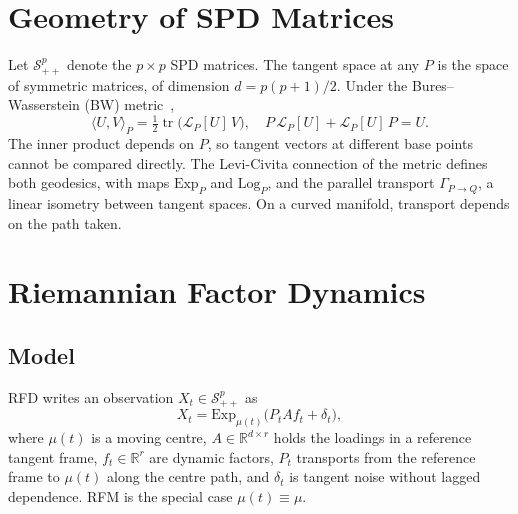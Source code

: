 \documentclass[journal]{IEEEtran}
\newcommand{\Exp}{\mathrm{Exp}}
\newcommand{\Log}{\mathrm{Log}}
\newcommand{\PT}{\Gamma}
\begin{document}
\section{Geometry of SPD Matrices}\label{sec:geom}
Let $\mathcal{S}_{++}^{p}$ denote the $p\times p$ SPD matrices. The tangent
space at any $P$ is the space of symmetric matrices, of dimension
$d=p(p+1)/2$. Under the Bures--Wasserstein (BW) metric~\cite{bhatia2019},
\begin{equation}
\langle U,V\rangle_P=\tfrac12\operatorname{tr}\!\big(\mathcal{L}_P[U]\,V\big),
\quad P\,\mathcal{L}_P[U]+\mathcal{L}_P[U]\,P=U .
\end{equation}
The inner product depends on $P$, so tangent vectors at different base
points cannot be compared directly. The Levi-Civita connection of the
metric defines both geodesics, with maps $\Exp_P$ and $\Log_P$, and the
parallel transport $\PT_{P\to Q}$, a linear isometry between tangent
spaces. On a curved manifold, transport depends on the path taken.

\section{Riemannian Factor Dynamics}\label{sec:method}

\subsection{Model}
RFD writes an observation $X_t\in\mathcal{S}_{++}^{p}$ as
\begin{equation}\label{eq:model}
X_t=\Exp_{\mu(t)}\!\big(P_t A f_t+\delta_t\big),
\end{equation}
where $\mu(t)$ is a moving centre, $A\in\mathbb{R}^{d\times r}$ holds the
loadings in a reference tangent frame, $f_t\in\mathbb{R}^{r}$ are dynamic
factors, $P_t$ transports from the reference frame to $\mu(t)$ along the
centre path, and $\delta_t$ is tangent noise without lagged dependence.
RFM is the special case $\mu(t)\equiv\mu$.
\end{document}
